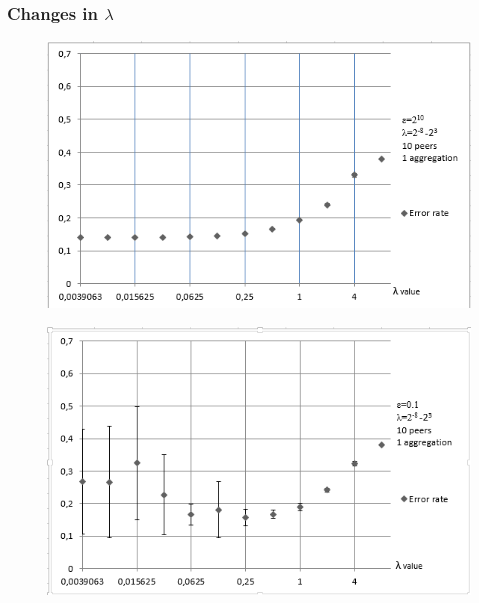 \subsubsection{Changes in $\lambda$}
\begin{figure}[H]
	\centering
	\begin{minipage}{.68\linewidth}
		\includegraphics[width=\linewidth]{fig/spambase/regularization_extremelyhighepsilon}
		\label{fig:regularization_extremelyhighepsilon}
	\end{minipage}
	\hspace{1mm}
	\begin{minipage}{.68\linewidth}
		\includegraphics[width=\linewidth]{fig/spambase/regularization_normalepsilon}
		\label{fig:regularization_normalepsilon}
	\end{minipage}
	\hspace{1mm}

\end{figure}
